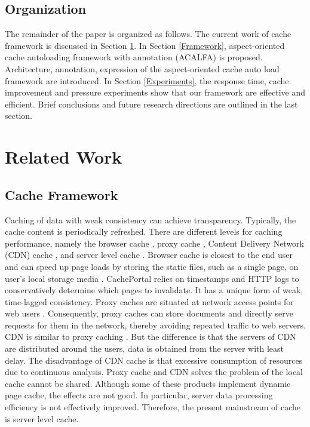 \documentclass{singlecol-new}
\theoremstyle{TH}{
\newtheorem{lemma}{Lemma}
\newtheorem{theorem}[lemma]{Theorem}
\newtheorem{corrolary}[lemma]{Corrolary}
\newtheorem{conjecture}[lemma]{Conjecture}
\newtheorem{proposition}[lemma]{Proposition}
\newtheorem{claim}[lemma]{Claim}
\newtheorem{stheorem}[lemma]{Wrong Theorem}
}
\theoremstyle{THrm}{
\newtheorem{definition}{Definition}[section]
\newtheorem{question}{Question}[section]
\newtheorem{remark}{Remark}
\newtheorem{scheme}{Scheme}
}
\theoremstyle{THhit}{
\newtheorem{case}{Case}[section]
}
\begin{document}
\subsection{Organization}
The remainder of the paper is organized as follows. The current work of cache framework is discussed in Section \ref{RelatedWork}. In Section \ref{Framework}, aspect-oriented cache autoloading framework with annotation (ACALFA) is proposed. Architecture, annotation, expression of the aspect-oriented cache auto load framework are introduced. In Section \ref{Experiments}, the response time, cache improvement and pressure experiments show that our framework are effective and efficient. Brief conclusions and future research directions are outlined in the last section.


\section{Related Work}
\label{RelatedWork}

\subsection{Cache Framework}
Caching of data with weak consistency can achieve transparency. Typically, the cache content is periodically refreshed. There are different levels for caching performance, namely the browser cache \cite{davison2001web}, proxy cache \cite{kumar2008new}, Content Delivery Network (CDN) cache \cite{vakali2003content}, and server level cache \cite{ma2017column}. Browser cache is closest to the end user and can speed up page loads by storing the static files, such as a single page, on user's local storage media \cite{mookerjee2002analysis}. CachePortal \cite{candan2001enabling} relies on timestamps and HTTP logs to conservatively determine which pages to invalidate. It has a unique form of weak, time-lagged consistency. Proxy caches are situated at network access points for web users \cite{kumar2008new}. Consequently, proxy caches can store documents and directly serve requests for them in the network, thereby avoiding repeated traffic to web servers. CDN is similar to proxy caching \cite{vakali2003content}. But the difference is that the servers of CDN are distributed around the users, data is obtained from the server with least delay. The disadvantage of CDN cache is that excessive consumption of resources due to continuous analysis. Proxy cache and CDN solves the problem of the local cache cannot be shared. Although some of these products implement dynamic page cache, the effects are not good. In particular, server data processing efficiency is not effectively improved. Therefore, the present mainstream of cache is server level cache.
\end{document}
